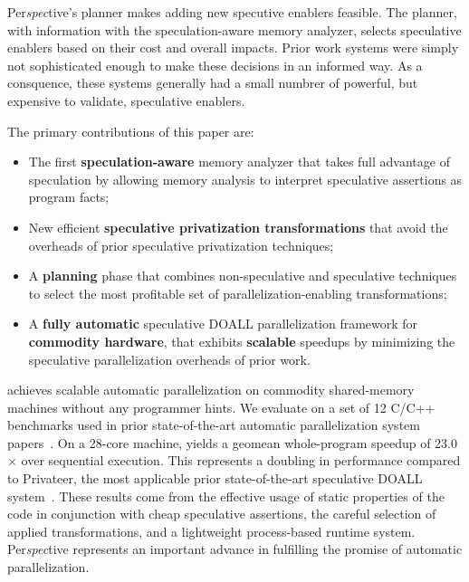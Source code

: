 Per{\em spec}tive's planner makes adding new specutive enablers feasible.  The
planner, with information with the speculation-aware memory analyzer,
selects speculative enablers based on their cost and overall impacts.
Prior work systems were simply not sophisticated enough to make these
decisions in an informed way.  As a consquence, these systems
generally had a small numbrer of powerful, but expensive to validate,
speculative enablers.

The primary contributions of this paper are:
\begin{itemize}

\item The first \textbf{speculation-aware} memory analyzer that takes
  full advantage of speculation by allowing memory analysis to
  interpret speculative assertions as program facts;

\item New efficient \textbf{speculative privatization transformations}
that avoid the overheads of prior speculative privatization
techniques;

\item A \textbf{planning} phase that combines non-speculative
and speculative techniques to select the most profitable set of
parallelization-enabling transformations;

\item A \textbf{fully automatic} speculative DOALL parallelization
framework for \textbf{commodity hardware}, that exhibits
\textbf{scalable} speedups by minimizing the speculative
parallelization overheads of prior work.

\end{itemize}

\name achieves scalable automatic parallelization on commodity
shared-memory machines without any programmer hints.  We evaluate
\name on a set of 12 C/C++ benchmarks used in prior state-of-the-art
automatic parallelization system
papers~\cite{johnson:12:pldi,kim:12:cgo,simone:12:cgo}. On a 28-core
machine, \name yields a geomean whole-program speedup of 23.0$\times$
over sequential execution.  This represents a doubling in performance
compared to Privateer, the most applicable prior state-of-the-art
speculative DOALL system~\cite{johnson:12:pldi}.  These results come
from the effective usage of static properties of the code in
conjunction with cheap speculative assertions, the careful selection
of applied transformations, and a lightweight process-based runtime
system.  Per{\em spec}tive represents an important advance in
fulfilling the promise of automatic parallelization.



